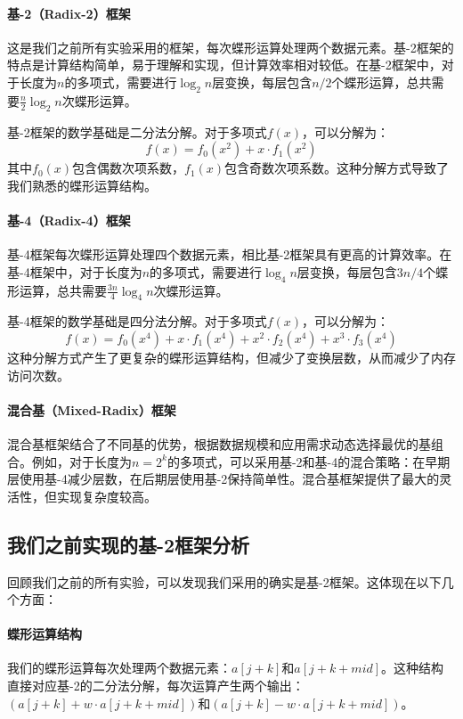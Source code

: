\documentclass[a4paper]{article}
\begin{document}
\paragraph{基-2（Radix-2）框架} 这是我们之前所有实验采用的框架，每次蝶形运算处理两个数据元素。基-2框架的特点是计算结构简单，易于理解和实现，但计算效率相对较低。在基-2框架中，对于长度为$n$的多项式，需要进行$\log_2 n$层变换，每层包含$n/2$个蝶形运算，总共需要$\frac{n}{2} \log_2 n$次蝶形运算。

基-2框架的数学基础是二分法分解。对于多项式$f(x)$，可以分解为：
$$f(x) = f_0(x^2) + x \cdot f_1(x^2)$$
其中$f_0(x)$包含偶数次项系数，$f_1(x)$包含奇数次项系数。这种分解方式导致了我们熟悉的蝶形运算结构。

\paragraph{基-4（Radix-4）框架} 基-4框架每次蝶形运算处理四个数据元素，相比基-2框架具有更高的计算效率。在基-4框架中，对于长度为$n$的多项式，需要进行$\log_4 n$层变换，每层包含$3n/4$个蝶形运算，总共需要$\frac{3n}{4} \log_4 n$次蝶形运算。

基-4框架的数学基础是四分法分解。对于多项式$f(x)$，可以分解为：
$$f(x) = f_0(x^4) + x \cdot f_1(x^4) + x^2 \cdot f_2(x^4) + x^3 \cdot f_3(x^4)$$
这种分解方式产生了更复杂的蝶形运算结构，但减少了变换层数，从而减少了内存访问次数。

\paragraph{混合基（Mixed-Radix）框架} 混合基框架结合了不同基的优势，根据数据规模和应用需求动态选择最优的基组合。例如，对于长度为$n = 2^k$的多项式，可以采用基-2和基-4的混合策略：在早期层使用基-4减少层数，在后期层使用基-2保持简单性。混合基框架提供了最大的灵活性，但实现复杂度较高。

\subsection{我们之前实现的基-2框架分析}

回顾我们之前的所有实验，可以发现我们采用的确实是基-2框架。这体现在以下几个方面：

\paragraph{蝶形运算结构} 我们的蝶形运算每次处理两个数据元素：$a[j+k]$和$a[j+k+mid]$。这种结构直接对应基-2的二分法分解，每次运算产生两个输出：$(a[j+k] + w \cdot a[j+k+mid])$和$(a[j+k] - w \cdot a[j+k+mid])$。
\end{document}
